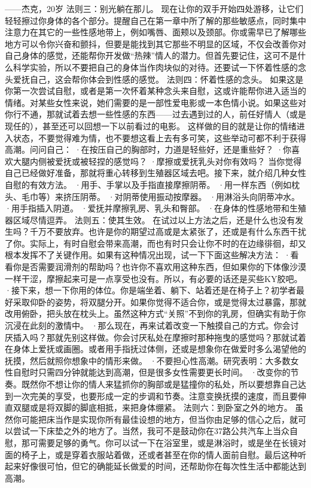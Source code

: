 \documentclass[12pt,UTF8,openany]{ctexbook}
\begin{document}
——杰克，20岁
法则三：别光躺在那儿。
现在让你的双手开始四处游移，让它们轻轻擦过你身体的各个部分。提醒自己在第一章中所了解的那些敏感点，同时集中注意力在其它的一些性感地带上，例如嘴唇、面颊以及颈部。你或需早已了解哪些地方可以令你兴奋和颤抖，但要是能找到其它那些不明显的区域，不仅会改善你对自己身体的感觉，还能帮你开发做“热辣”情人的潜力。但首先要记住，这可不是什么科学实验，所以不要把自己的身体当作肉块似的对待。还要试一下怀着性感的念头爱抚自己，这会帮你体会到性感的感觉。
法则四：怀着性感的念头。
如果这是你第一次尝试自慰，或者是第一次怀着某种念头来自慰，这或许能帮你进入适当的情绪。对某些女性来说，她们需要的是一部性爱电影或一本色情小说。如果这些对你行不通，那就试着去想一些性感的东西——过去遇到过的人，前任好情人（或是现任的），甚至还可以回想一下以前看过的电影。
这样做的目的就是让你的情绪进入状态，不要觉得难为情，也不要想这看上去有多可笑，这些举动可都不利于获得高潮。问问自己：
·在按压自己的胸部时，力道是轻些好，还是重些好？
·你喜欢大腿内侧被爱抚或被轻捏的感觉吗？
·摩擦或爱抚乳头对你有效吗？
当你觉得自己已经做好准备，那就将重心转移到生殖器区域去吧。接下来，就介绍几种女性自慰的有效方法。
·用手、手掌以及手指直接摩擦阴蒂。
·用一样东西（例如枕头、毛巾等）来挤压阴蒂。
·对阴蒂使用振动按摩器。
·用淋浴头向阴蒂冲水。
·用手指插入阴道。
·爱抚并摩擦乳房、乳头和臀部。
·在身体的性感地带和生殖器区域尽情逗弄。
法则五：使其生效。
在试过以上方法之后，还是什么也没有发生吗？千万不要放弃。也许是你的期望过高或是太紧张了，还或是有什么东西干扰了你。实际上，有时自慰会带来高潮，而也有时只会让你不时的在边缘徘徊，却又根本发挥不了关键作用。如果有这种情况出现，试一下下面这些解决方法：
·看看你是否需要润滑剂的帮助吗？也许你不喜欢用这种东西，但如果你的下体像沙漠一样干涩，摩擦起来可是一点享受也没有。所以，有必要的话还是买些KY胶吧。
·接下来，想一下你用的体位。你是端坐着、躺下、站着还是在椅子上？初学者最好采取仰卧的姿势，将双腿分开。如果你觉得不适合你，或是觉得太过暴露，那就改用俯卧，把头放在枕头上。虽然这种方式“关照”不到你的乳房，但确实有助于你沉浸在此刻的激情中。
·那么现在，再来试着改变一下触摸自己的方式。你会讨厌插入吗？那就先别这样做。你会讨厌私处在摩擦时那种拖曳的感觉吗？那就试着在身体上爱抚或画圈。或者用手指抚过体侧，还或是想象你在做爱时多么渴望他的抚摸，然后就照你想象中的情形来做。
·不要担心性高潮。研究表明：大多数女性自慰时只需四分钟就能达到高潮，但是很多女性需要更长时间。
·改变你的节奏。既然你不想让你的情人来猛抓你的胸部或是猛撞你的私处，所以要想靠自己达到一次完美的享受，也要形成一定的步调和节奏。注意变换抚摸的速度，而且要伸直双腿或是将双脚的脚底相抵，来把身体绷紧。
法则六：到卧室之外的地方。
虽然你可能把床当作是实现你所有最佳设想的地方，但当你由足够的信心之后，就可以尝试一下床垫之外的地方了。当然，我可不是鼓动你在37路公共汽车上当众自慰，那可需要足够的勇气。你可以试一下在浴室里，或是淋浴时，或是坐在长镜对面的椅子上，或是穿着衣服站着做，还或者甚至在你的情人面前自慰。最后这种听起来好像很可怕，但它的确能延长做爱的时间，还帮助你在每次性生活中都能达到高潮。
\end{document}
